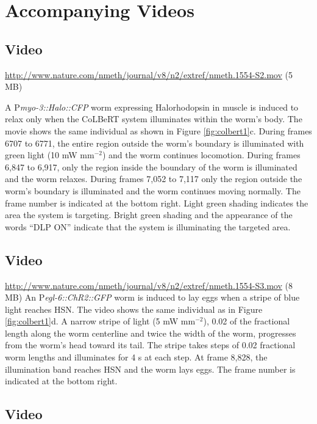 \section{Accompanying Videos}
\subsection{Video}\label{movie:colbert1} %
\url{http://www.nature.com/nmeth/journal/v8/n2/extref/nmeth.1554-S2.mov} (5 MB)

A P\textit{myo-3::Halo::CFP} worm expressing Halorhodopsin in muscle is induced to relax only when the CoLBeRT system illuminates within the worm's body. The movie shows the same individual as shown in Figure \ref{fig:colbert1}c. During frames 6707 to 6771, the entire region outside the worm's boundary is illuminated with green light (10 mW mm$^{−2}$) and the worm continues locomotion. During frames 6,847 to 6,917, only the region inside the boundary of the worm is illuminated and the worm relaxes. During frames 7,052 to 7,117 only the region outside the worm's boundary is illuminated and the worm continues moving normally. The frame number is indicated at the bottom right. Light green shading indicates the area the system is targeting. Bright green shading and the appearance of the words “DLP ON” indicate that the system is illuminating the targeted area.

\subsection{Video}\label{movie:colbert2} %

\url{http://www.nature.com/nmeth/journal/v8/n2/extref/nmeth.1554-S3.mov} (8 MB)
An P\textit{egl-6::ChR2::GFP} worm is induced to lay eggs when a stripe of blue light reaches HSN. The video shows the same individual as in Figure \ref{fig:colbert1}d. A narrow stripe of light (5 mW mm$^{−2}$), 0.02 of the fractional length along the worm centerline and twice the width of the worm, progresses from the worm's head toward its tail. The stripe takes steps of 0.02 fractional worm lengths and illuminates for 4 s at each step. At frame 8,828, the illumination band reaches HSN and the worm lays eggs. The frame number is indicated at the bottom right.

\subsection{Video}\label{movie:colbert3} %

